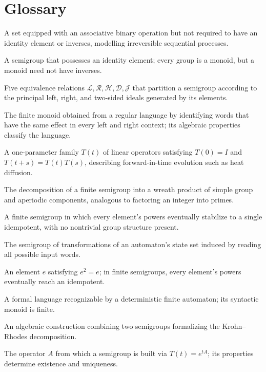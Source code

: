 \section*{Glossary}
\begin{description}[leftmargin=*,style=nextline,itemsep=0.3em]
\item[\textbf{Semigroup.}] A set equipped with an associative binary operation but not required to have an identity element or inverses, modelling irreversible sequential processes.
\item[\textbf{Monoid.}] A semigroup that possesses an identity element; every group is a monoid, but a monoid need not have inverses.
\item[\textbf{Green's relations.}] Five equivalence relations $\mathcal{L},\mathcal{R},\mathcal{H},\mathcal{D},\mathcal{J}$ that partition a semigroup according to the principal left, right, and two-sided ideals generated by its elements.
\item[\textbf{Syntactic monoid.}] The finite monoid obtained from a regular language by identifying words that have the same effect in every left and right context; its algebraic properties classify the language.
\item[\textbf{Operator semigroup.}] A one-parameter family $T(t)$ of linear operators satisfying $T(0)=I$ and $T(t+s)=T(t)T(s)$, describing forward-in-time evolution such as heat diffusion.
\item[\textbf{Krohn--Rhodes theorem.}] The decomposition of a finite semigroup into a wreath product of simple group and aperiodic components, analogous to factoring an integer into primes.
\item[\textbf{Aperiodic semigroup.}] A finite semigroup in which every element's powers eventually stabilize to a single idempotent, with no nontrivial group structure present.
\item[\textbf{Transition semigroup.}] The semigroup of transformations of an automaton's state set induced by reading all possible input words.
\item[\textbf{Idempotent.}] An element $e$ satisfying $e^2=e$; in finite semigroups, every element's powers eventually reach an idempotent.
\item[\textbf{Regular language.}] A formal language recognizable by a deterministic finite automaton; its syntactic monoid is finite.
\item[\textbf{Wreath product.}] An algebraic construction combining two semigroups formalizing the Krohn--Rhodes decomposition.
\item[\textbf{Generator.}] The operator $A$ from which a semigroup is built via $T(t)=e^{tA}$; its properties determine existence and uniqueness.
\end{description}
